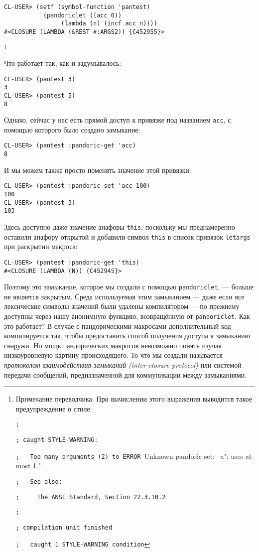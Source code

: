 \begin{verbatim}
CL-USER> (setf (symbol-function 'pantest)
	       (pandoriclet ((acc 0))
			    (lambda (n) (incf acc n))))
#<CLOSURE (LAMBDA (&REST #:ARGS2)) {C452955}>
\end{verbatim}
\footnote{Примечание переводчика: При вычислении этого выражения выводится такое предупреждение о стиле:

\verb"; "

\verb"; caught STYLE-WARNING:"

\verb";   Too many arguments (2) to ERROR "Unknown pandoric set: ~a": uses at most 1."

\verb";   See also:"

\verb";     The ANSI Standard, Section 22.3.10.2"

\verb"; "

\verb"; compilation unit finished"

\verb";   caught 1 STYLE-WARNING condition"


}

Что работает так, как и задумывалось:

\begin{verbatim}
CL-USER> (pantest 3)
3
CL-USER> (pantest 5)
8
\end{verbatim}

Однако, сейчас у нас есть прямой доступ к привязке под названием \verb"acc", с помощью которого было создано замыкание:

\begin{verbatim}
CL-USER> (pantest :pandoric-get 'acc)
8
\end{verbatim}

И мы можем также просто поменять значение этой привязки:

\begin{verbatim}
CL-USER> (pantest :pandoric-set 'acc 100)
100
CL-USER> (pantest 3)
103
\end{verbatim}

Здесь доступно даже значение анафоры \verb"this", поскольку мы преднамеренно оставили анафору открытой и добавили символ \verb"this" в список привязок \verb"letargs" при раскрытии макроса:

\begin{verbatim}
CL-USER> (pantest :pandoric-get 'this)
#<CLOSURE (LAMBDA (N)) {C452945}>
\end{verbatim}

Поэтому это замыкание, которое мы создали с помощью \verb"pandoriclet", --- больше не является закрытым. Среда используемая этим замыканием --- даже если все лексические символы значений были удалены компилятором --- по прежнему доступны через нашу анонимную функцию, возвращённую от \verb"pandoriclet". Как это работает? В случае с пандорическими макросами дополнительный код компилируется так, чтобы предоставить способ получения доступа к замыканию снаружи. Но мощь пандорических макросов невозможно понять изучая низкоуровневую картину происходящего. То что мы создали называется \emph{протоколом взаимодействия замыканий (inter-closure protocol)} или системой передачи сообщений, предназначенной для коммуникации между замыканиями.

